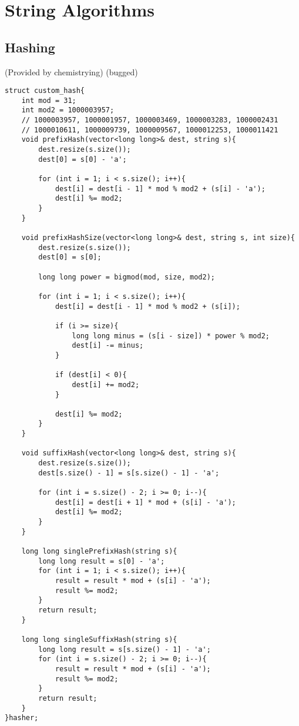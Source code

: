 \documentclass{article}
\begin{document}
\section{String Algorithms}
\subsection{Hashing}
(Provided by chemistrying) (bugged)
\begin{verbatim}
struct custom_hash{
    int mod = 31;
    int mod2 = 1000003957;
    // 1000003957, 1000001957, 1000003469, 1000003283, 1000002431
    // 1000010611, 1000009739, 1000009567, 1000012253, 1000011421
    void prefixHash(vector<long long>& dest, string s){
        dest.resize(s.size());
        dest[0] = s[0] - 'a';

        for (int i = 1; i < s.size(); i++){
            dest[i] = dest[i - 1] * mod % mod2 + (s[i] - 'a');
            dest[i] %= mod2;
        }
    }

    void prefixHashSize(vector<long long>& dest, string s, int size){
        dest.resize(s.size());
        dest[0] = s[0];

        long long power = bigmod(mod, size, mod2);

        for (int i = 1; i < s.size(); i++){
            dest[i] = dest[i - 1] * mod % mod2 + (s[i]);
            
            if (i >= size){
                long long minus = (s[i - size]) * power % mod2;
                dest[i] -= minus;
            }

            if (dest[i] < 0){
                dest[i] += mod2;
            }
            
            dest[i] %= mod2;
        }
    }

    void suffixHash(vector<long long>& dest, string s){
        dest.resize(s.size());
        dest[s.size() - 1] = s[s.size() - 1] - 'a';
        
        for (int i = s.size() - 2; i >= 0; i--){
            dest[i] = dest[i + 1] * mod + (s[i] - 'a');
            dest[i] %= mod2;
        }
    }

    long long singlePrefixHash(string s){
        long long result = s[0] - 'a';
        for (int i = 1; i < s.size(); i++){
            result = result * mod + (s[i] - 'a');
            result %= mod2;
        }
        return result;
    }

    long long singleSuffixHash(string s){
        long long result = s[s.size() - 1] - 'a';
        for (int i = s.size() - 2; i >= 0; i--){
            result = result * mod + (s[i] - 'a');
            result %= mod2;
        }
        return result;
    }
}hasher;
\end{verbatim}
\pagebreak
\end{document}
